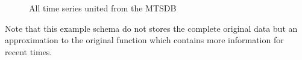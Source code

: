 \begin{figure}[tp]
  \centering
  
  \caption{All time series united from the MTSDB}
  \label{fig:exemple:4mrdtot}
\end{figure}

Note that this  example schema do not stores the complete
original data but an approximation to the original function which
contains more information for recent times.



